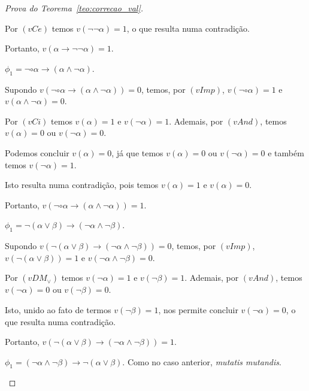 \begin{proof}[Prova do Teorema~\ref{teo:correcao_val}]
\begin{provaporcasos}
\begin{provaporsubcasos}
                        Por $(vCe)$ temos $v(\neg \neg \alpha) = 1$, o que resulta numa contradição. 
                        
                        Portanto, $v(\alpha \to \neg \neg \alpha) = 1$.
    
                    \subcasodeprova{} $\phi_{1} = \neg \circ \alpha \to (\alpha \land \neg \alpha)$. 
                    
                        Supondo $v(\neg \circ \alpha \to (\alpha \land \neg \alpha)) = 0$, temos, por $(vImp)$, $v(\neg \circ \alpha) = 1$ e $v(\alpha \land \neg \alpha) = 0$. 
                        
                        Por $(vCi)$ temos $v(\alpha) = 1$ e $v(\neg \alpha) = 1$. Ademais, por $(vAnd)$, temos $v(\alpha) = 0$ ou $v(\neg \alpha) = 0$. 
                        
                        Podemos concluir $v(\alpha) = 0$, já que temos $v(\alpha) = 0$ ou $v(\neg \alpha) = 0$ e também temos $v(\neg \alpha) = 1$. 
                        
                        Isto resulta numa contradição, pois temos $v(\alpha) = 1$ e  $v(\alpha) = 0$. 
                        
                        Portanto, $v(\neg \circ \alpha \to (\alpha \land \neg \alpha)) = 1$.
    
                    \subcasodeprova{} $\phi_{1} = \neg (\alpha \lor \beta) \to (\neg \alpha \land \neg \beta)$. 
                    
                        Supondo $v(\neg (\alpha \lor \beta) \to (\neg \alpha \land \neg \beta)) = 0$, temos, por $(vImp)$, $v(\neg (\alpha \lor \beta)) = 1$ e $v(\neg \alpha \land \neg \beta) = 0$. 
                        
                        Por $(vDM_{\lor})$ temos $v(\neg \alpha) = 1$ e $v(\neg \beta) = 1$. Ademais, por $(vAnd)$, temos $v(\neg \alpha) = 0$ ou $v(\neg \beta) = 0$. 
                        
                        Isto, unido ao fato de termos $v(\neg \beta) = 1$, nos permite concluir $v(\neg \alpha) = 0$, o que resulta numa contradição. 
                        
                        Portanto, $v(\neg (\alpha \lor \beta) \to (\neg \alpha \land \neg \beta)) = 1$.
    
    
                    \subcasodeprova{} $\phi_{1} = (\neg \alpha \land \neg \beta) \to \neg (\alpha \lor \beta)$. Como no caso anterior, \textit{mutatis mutandis}.
    

\end{provaporsubcasos}
\end{provaporcasos}
\end{proof}
